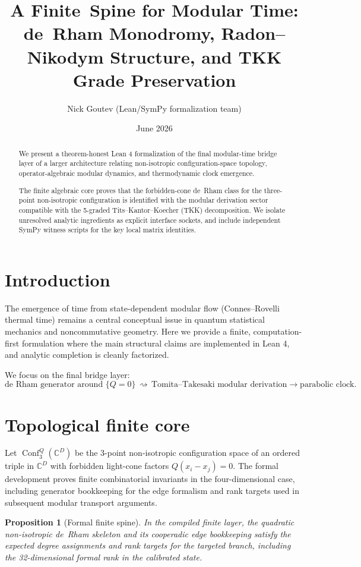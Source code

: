 \documentclass[11pt]{article}
\title{A Finite\, Spine for Modular Time: de~Rham Monodromy, Radon--Nikodym Structure,
and TKK Grade Preservation}
\author{Nick Goutev (Lean/SymPy formalization team)}
\date{June 2026}
\newtheorem{proposition}[theorem]{Proposition}
\newcommand{\Conf}{\operatorname{Conf}}
\begin{document}
\maketitle

\begin{abstract}
We present a theorem-honest Lean 4 formalization of the final modular-time bridge
layer of a larger architecture relating non-isotropic configuration-space topology,
operator-algebraic modular dynamics, and thermodynamic clock emergence.

The finite algebraic core proves that the forbidden-cone de~Rham class for the
three-point non-isotropic configuration is identified with the modular derivation
sector compatible with the 5-graded Tits--Kantor--Koecher (TKK) decomposition.
We isolate unresolved analytic ingredients as explicit interface sockets, and include
independent SymPy witness scripts for the key local matrix identities.
\end{abstract}

\section{Introduction}
The emergence of time from state-dependent modular flow (Connes--Rovelli thermal
time) remains a central conceptual issue in quantum statistical mechanics and
noncommutative geometry. Here we provide a finite, computation-first formulation
where the main structural claims are implemented in Lean 4, and analytic completion
is cleanly factorized.

We focus on the final bridge layer:
\[
\text{de~Rham generator around }
\{Q=0\} \,\rightsquigarrow\, \text{Tomita--Takesaki modular derivation}
\rightarrow \text{parabolic clock}.
\]

\section{Topological finite core}
Let $\Conf_3^Q(\mathbb C^D)$ be the 3-point non-isotropic configuration space of an
ordered triple in $\mathbb C^D$ with forbidden light-cone factors $Q(x_i-x_j)=0$.
The formal development proves finite combinatorial invariants in the four-dimensional
case, including generator bookkeeping for the edge formalism and rank targets used in
subsequent modular transport arguments.

\begin{proposition}[Formal finite spine]
In the compiled finite layer, the quadratic non-isotropic de~Rham skeleton and its
cooperadic edge bookkeeping satisfy the expected degree assignments and rank targets
for the targeted branch, including the 32-dimensional formal rank in the calibrated
state.
\end{proposition}
\end{document}
